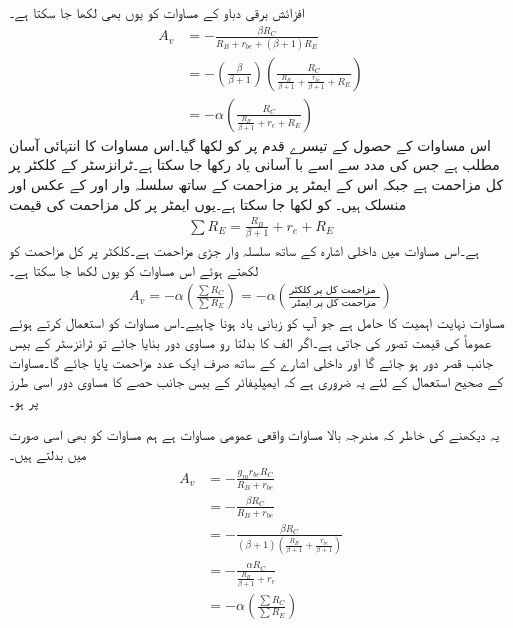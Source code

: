 افزائش برقی دباو کے مساوات کو یوں بھی لکھا جا سکتا ہے۔
\begin{align*}
A_v&=-\frac{\beta R_C}{R_B+r_{be}+\left(\beta+1 \right )R_E}\\
&=-\left(\frac{\beta}{\beta+1} \right) \left (\frac{R_C}{\frac{R_B}{\beta+1}+\frac{r_{be}}{\beta+1}+R_E} \right )\\
&=-\alpha \left(\frac{R_C}{\frac{R_B}{\beta+1}+r_e+R_E} \right )
\end{align*}
اس مساوات کے حصول کے تیسرے قدم پر  کو  لکھا گیا۔اس مساوات کا انتہائی آسان مطلب ہے جس کی مدد سے اسے با آسانی یاد رکھا جا سکتا ہے۔ٹرانزسٹر کے کلکٹر  پر کل مزاحمت  ہے جبکہ اس کے ایمٹر پر مزاحمت  کے ساتھ سلسلہ وار  اور  کے عکس   اور  منسلک ہیں۔  کو   لکھا جا سکتا ہے۔یوں ایمٹر پر کل مزاحمت   کی قیمت 
\begin{align*}
\sum {R_E}=\frac{R_B}{\beta+1}+r_e+R_E
\end{align*}
ہے۔اس مساوات میں  داخلی اشارہ  کے ساتھ سلسلہ وار جڑی مزاحمت ہے۔کلکٹر  پر کل مزاحمت کو  لکھتے ہوئے اس مساوات کو یوں لکھا جا سکتا ہے۔
\begin{align} \label{مساوات_ٹرانزسٹر_ایمپلیفائر_کی_افزائش_کلکٹر _مخارج_مزاحمتوں_کی_شرح}
A_v = - \alpha \left(\frac{\sum{R_C}}{\sum{R_E}} \right )=-\alpha \left(\frac{\textrm {مزاحمت کل پر کلکٹر }}{\textrm{ مزاحمت کل پر ایمٹر }} \right )
\end{align}
مساوات   نہایت اہمیت کا حامل ہے جو آپ کو زبانی یاد ہونا چاہیے۔اس مساوات کو استعمال کرتے ہوئے عموماً  کی قیمت  تصور کی جاتی ہے۔اگر  الف کا بدلتا رو مساوی دور بنایا جائے تو ٹرانزسٹر کے بیس جانب  قصر دور ہو جائے گا اور داخلی اشارے  کے ساتھ صرف ایک عدد مزاحمت  پایا جائے گا۔مساوات  کے صحیح استعمال کے لئے یہ ضروری ہے کہ ایمپلیفائر کے بیس جانب حصے کا مساوی دور اسی طرز پر ہو۔  

یہ دیکھنے کی خاطر کہ مندرجہ بالا مساوات واقعی عمومی مساوات ہے ہم مساوات  کو بھی اسی صورت میں بدلتے ہیں۔
\begin{align*}
A_v&=-\frac{g_m r_{be} R_C}{R_B+r_{be}}\\
&=-\frac{\beta R_C}{R_B+r_{be}}\\
&=-\frac{\beta R_C}{\left(\beta+1 \right ) \left(\frac{R_B}{\beta+1}+\frac{r_{be}}{\beta+1} \right )}\\
&=-\frac{\alpha R_C}{\frac{R_B}{\beta+1}+r_e}\\
&=-\alpha \left(\frac{\sum R_C}{\sum R_E} \right )
\end{align*}


